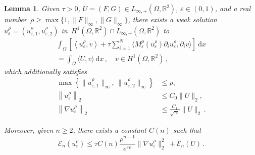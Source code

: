 \documentclass[10pt]{amsart}
\newtheorem{lemm}[theo]{Lemma}\newtheorem{prop}[theo]{Proposition}\newtheorem{coro}[theo]{Corollary}\newtheorem{conj}[theo]{Conjecture}
\theoremstyle{definition}\newtheorem{defi}[theo]{Definition}\newtheorem{rema}[theo]{Remark}\newtheorem{exam}[theo]{Example}\newtheorem{exem}[theo]{Example}\newtheorem{nota}[theo]{Notation}
\newcommand{\bbR}{\mathbb{R}}
\newcommand{\clE}{\mathcal{E}}
\newcommand{\rmd}{\mathrm{d}}
\begin{document}
\begin{lemm}\label{lem.ex2}
Given $\tau>0$, $U=(F,G)\in L_{\infty,+}(\Omega,\bbR^2)$, $\varepsilon\in (0,1)$, and a real number~${\rho\geq \max\{1,\|F\|_\infty,\|G\|_\infty\}}$, there exists a weak solution $u_{\varepsilon}^\rho=(u_{\varepsilon,1}^\rho, u_{\varepsilon,2}^\rho)$ in~${H^1(\Omega,\bbR^2)\cap L_{\infty,+}(\Omega,\bbR^2)}$ to
\begin{multline}\label{ex12a}
\int_\Omega \left[\left\langle u_{\varepsilon}^\rho, v \right\rangle + \tau \sum_{i=1}^N\big\langle M_{\varepsilon }^\rho(u_{\varepsilon}^\rho) \partial_i u_{\varepsilon}^\rho, \partial_i v \big\rangle \right]\ \rmd x\\ = \int_\Omega \langle U, v \rangle\ \rmd x\,, \quad v\in H^1\left(\Omega,\bbR^2\right)\,, 
\end{multline}
which additionally satisfies
\begin{align}
\max\left\{\|u_{\varepsilon,1}^\rho\|_\infty,\,\|u_{\varepsilon,2}^\rho\|_\infty\right\}&\leq \rho\label{ex12a'}
,\\[1ex]
\left\|u_{\varepsilon}^\rho\right\|_2&\leq C_0\|U\|_2,\label{ex12d}
\\[1ex]
\left\|\nabla u_{\varepsilon}^\rho\right\|_2&\leq \frac{C_1}{\sqrt{\tau\varepsilon}} \|U\|_2\,.\label{ex12e}
\end{align}

Moreover, given $n\ge 2$, there exists a constant $C(n)$ such that
\begin{equation}\label{ex12c}
\clE_n(u_\varepsilon^\rho)\le \tau C(n) \frac{\rho^{n-1}}{e^{\varepsilon\rho}}\|\nabla u_\varepsilon^\rho\|_2^2\ + \clE_n(U)\,. 
\end{equation}
\end{lemm}
\end{document}
